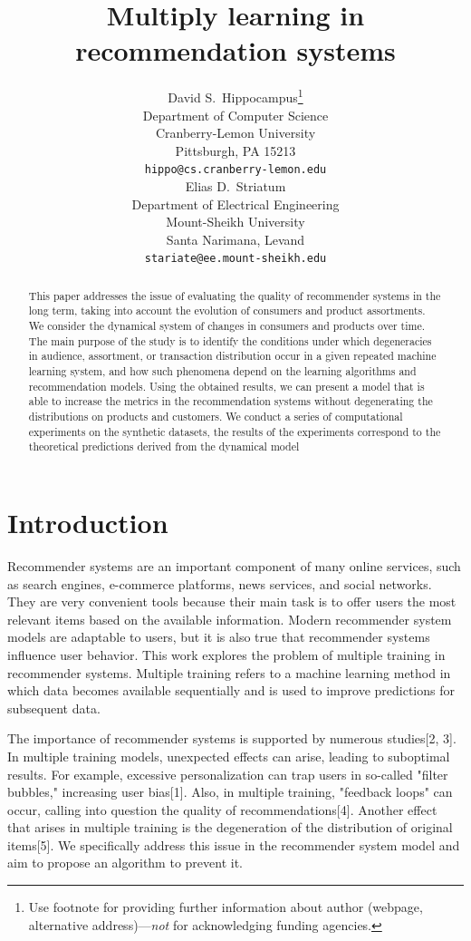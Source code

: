 \documentclass{article}
\title{Multiply learning in recommendation systems}
\author{ David S.~Hippocampus\thanks{Use footnote for providing further
		information about author (webpage, alternative
		address)---\emph{not} for acknowledging funding agencies.} \\
	Department of Computer Science\\
	Cranberry-Lemon University\\
	Pittsburgh, PA 15213 \\
	\texttt{hippo@cs.cranberry-lemon.edu} \\
	\And
	Elias D.~Striatum \\
	Department of Electrical Engineering\\
	Mount-Sheikh University\\
	Santa Narimana, Levand \\
	\texttt{stariate@ee.mount-sheikh.edu} \\
}
\date{}
\begin{document}
\maketitle

\begin{abstract}
        This paper addresses the issue of evaluating the quality of recommender systems in the long term, taking into account the evolution of consumers and product assortments. We consider the dynamical system of changes in consumers and products over time. The main purpose of the study is to identify the conditions under which degeneracies in audience, assortment, or transaction distribution occur in a given repeated machine learning system, and how such phenomena depend on the learning algorithms and recommendation models. Using the obtained results, we can present a model that is able to increase the metrics in the recommendation systems without degenerating the distributions on products and customers. We conduct a series of computational experiments on the synthetic datasets, the results of the experiments correspond to the theoretical predictions derived from the dynamical model
\end{abstract}



\section{Introduction}
Recommender systems are an important component of many online services, such as search engines, e-commerce platforms, news services, and social networks. They are very convenient tools because their main task is to offer users the most relevant items based on the available information. Modern recommender system models are adaptable to users, but it is also true that recommender systems influence user behavior. This work explores the problem of multiple training in recommender systems. Multiple training refers to a machine learning method in which data becomes available sequentially and is used to improve predictions for subsequent data.

The importance of recommender systems is supported by numerous studies[2, 3]. In multiple training models, unexpected effects can arise, leading to suboptimal results. For example, excessive personalization can trap users in so-called "filter bubbles," increasing user bias[1]. Also, in multiple training, "feedback loops" can occur, calling into question the quality of recommendations[4]. Another effect that arises in multiple training is the degeneration of the distribution of original items[5]. We specifically address this issue in the recommender system model and aim to propose an algorithm to prevent it.
\end{document}

